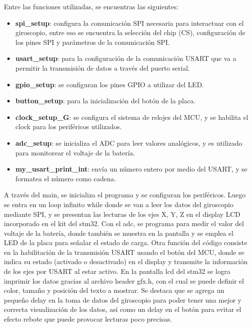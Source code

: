 Entre las funciones utilizadas, se encuentras las siguientes:
\begin{itemize}
    \item \textbf{spi\_setup}: configura la comunicación SPI necesaria para interactuar con el giroscopio, entre eso se encuentra la selección del chip (CS), configuración de los pines SPI y parámetros de la comunicación SPI. 
    \item \textbf{usart\_setup}: para la configuración de la comunicación USART que va a permitir la transmisión de datos a través del puerto serial.
    \item \textbf{gpio\_setup}: se configuran los pines GPIO a utilizar del LED. 
    \item \textbf{button\_setup}: para la inicialización del botón de la placa. 
    \item \textbf{clock\_setup\_G}: se configura el sistema de relojes del MCU, y se habilita el clock para los periféricos utilizados.
    \item \textbf{adc\_setup}: se inicializa el ADC para leer valores analógicos, y es utilizado para monitorear el voltaje de la batería.
    \item \textbf{my\_usart\_print\_int}: envía un número entero por medio del USART, y se formatea el número como cadena.
\end{itemize}

A través del main, se inicializa el programa y se configuran los periféricos. Luego se entra en un loop infinito while donde se van a leer los datos del giroscopio mediante SPI, y se presentan las lecturas de los ejes X, Y, Z en el display LCD incorporado en el kit del stm32. Con el adc, se programa para medir el valor del voltaje de la batería, donde también se muestra en la pantalla y se emplea el LED de la placa para señalar el estado de carga. Otra función del código consiste en la habilitación de la transmisión USART usando el botón del MCU, donde se indica su estado (activado o desactivado) en el display y transmite la información de los ejes por USART al estar activo. En la pantalla lcd del stm32 se logra imprimir los datos gracias al archivo header gfx.h, con el cual se puede definir el color, tamaño y posición del texto a mostrar. Se destaca que se agrega un pequeño delay en la toma de datos del giroscopio para poder tener una mejor y correcta visualización de los datos, así como un delay en el botón para evitar el efecto rebote que puede provocar lecturas poco precisas.  \\

